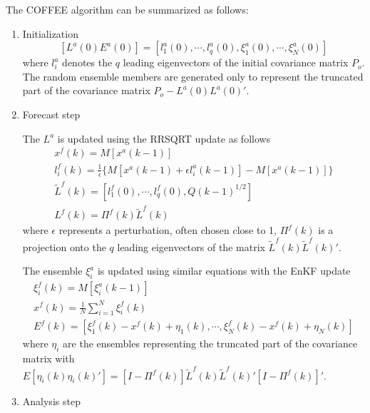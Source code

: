 \documentclass[a4paper,12pt]{article}
\begin{document}
       The COFFEE algorithm can be summarized as follows:
       \begin{enumerate}
        \item Initialization
              \begin{equation}
              \label{eq.COFFEE_initialmatrix}
                 [L^a(0) E^a(0)]=[l_1^a(0),\cdots,l_q^a(0),\xi_1^a(0),\cdots,\xi_N^a(0)]
              \end{equation}
              where $l_i^a$ denotes the $q$ leading eigenvectors of the initial covariance matrix $P_o$. The random ensemble members are generated only to represent the truncated part of the covariance matrix $P_o-L^a(0)L^a(0)'$.
        \item Forecast step

              The $L^a$ is updated using the RRSQRT update as follows
              \begin{eqnarray}
               x^f(k)=M[x^a(k-1)] \\
               l^f_i(k)=\frac{1}{\epsilon} \{ M[x^a(k-1)+ \epsilon  l^a_i(k-1)]-M[x^a(k-1)] \} \label{eq.COFFEE_lf} \\
               \tilde{L}^f(k)=[l_1^f(0),\cdots,l_q^f(0),Q(k-1)^{1/2}] \label{eq.COFFEE_Lf}\\
               L^f(k)=\Pi^f(k)\tilde{L}^f(k)
              \end{eqnarray}
              where $\epsilon$ represents a perturbation, often chosen close to 1, $\Pi^f(k)$ is a projection onto the $q$ leading eigenvectors of the matrix $\tilde{L}^f(k)\tilde{L}^f(k)'$.

              The ensemble $\xi_i^a$ is updated using similar equations with the EnKF update
              \begin{eqnarray}
               \xi_i^f(k)=M[\xi_i^a(k-1)] \\
               x^f(k)=\frac{1}{N} \sum_{i=1}^N \xi_i^f(k) \\
               E^f(k)=[\xi_1^f(k)-x^f(k)+\eta_1(k),\cdots,\xi_N^f(k)-x^f(k)+\eta_N(k)]
              \end{eqnarray}
              where $\eta_i$ are the ensembles representing the truncated part of the covariance matrix with $E[\eta_i(k)\eta_i(k)']=[I-\Pi^f(k)]\tilde{L}^f(k) \tilde{L}^f(k)'[I-\Pi^f(k)]'$.

        \item Analysis step


\end{enumerate}
\end{document}
